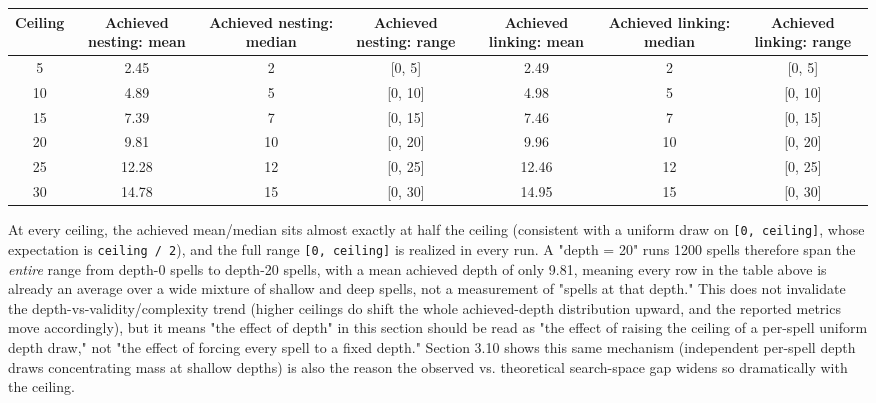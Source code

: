 \documentclass[
  10pt,
  twocolumn]{article}
\begin{document}
\begin{table}[t]
\centering
\begin{tabular}{@{}ccccccc@{}}
\toprule
Ceiling & Achieved nesting: mean & Achieved nesting: median & Achieved
nesting: range & Achieved linking: mean & Achieved linking: median &
Achieved linking: range \\
\midrule
5 & 2.45 & 2 & {[}0, 5{]} & 2.49 & 2 & {[}0, 5{]} \\
10 & 4.89 & 5 & {[}0, 10{]} & 4.98 & 5 & {[}0, 10{]} \\
15 & 7.39 & 7 & {[}0, 15{]} & 7.46 & 7 & {[}0, 15{]} \\
20 & 9.81 & 10 & {[}0, 20{]} & 9.96 & 10 & {[}0, 20{]} \\
25 & 12.28 & 12 & {[}0, 25{]} & 12.46 & 12 & {[}0, 25{]} \\
30 & 14.78 & 15 & {[}0, 30{]} & 14.95 & 15 & {[}0, 30{]} \\
\bottomrule
\end{tabular}
\end{table}

At every ceiling, the achieved mean/median sits almost exactly at half
the ceiling (consistent with a uniform draw on
\texttt{{[}0,\ ceiling{]}}, whose expectation is
\texttt{ceiling\ /\ 2}), and the full range \texttt{{[}0,\ ceiling{]}}
is realized in every run. A "depth = 20" run\textquotesingle s 1200
spells therefore span the \emph{entire} range from depth-0 spells to
depth-20 spells, with a mean achieved depth of only 9.81, meaning every
row in the table above is already an average over a wide mixture of
shallow and deep spells, not a measurement of "spells at that depth."
This does not invalidate the depth-vs-validity/complexity trend (higher
ceilings do shift the whole achieved-depth distribution upward, and the
reported metrics move accordingly), but it means "the effect of depth"
in this section should be read as "the effect of raising the ceiling of
a per-spell uniform depth draw," not "the effect of forcing every spell
to a fixed depth." Section 3.10 shows this same mechanism (independent
per-spell depth draws concentrating mass at shallow depths) is also the
reason the observed vs. theoretical search-space gap widens so
dramatically with the ceiling.
\end{document}
